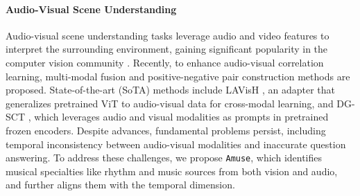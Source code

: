 \documentclass[11pt]{article}
\begin{document}
\paragraph{Audio-Visual Scene Understanding}
Audio-visual scene understanding tasks leverage audio and video features to interpret the surrounding environment, gaining significant popularity in the computer vision community \cite{antol2015vqa, zhao2018sound, zhao2019sound, tian2020unified}. Recently, to enhance audio-visual correlation learning, multi-modal fusion \cite{yun2021pano, yang2022avqa, diao2023av} and positive-negative pair construction \cite{li2022learning} methods are proposed. State-of-the-art (SoTA) methods include LAVisH \cite{lin2023vision}, an adapter that generalizes pretrained ViT \cite{dosovitskiy2020image} to audio-visual data for cross-modal learning, and DG-SCT \cite{duan2024cross}, which leverages audio and visual modalities as prompts in pretrained frozen encoders.
Despite advances, fundamental problems persist, including temporal inconsistency between audio-visual modalities and inaccurate question answering. To address these challenges, we propose \texttt{Amuse}, which identifies musical specialties like rhythm and music sources from both vision and audio, and further aligns them with the temporal dimension.
\end{document}
